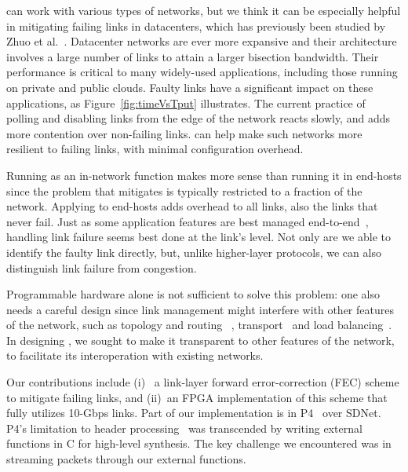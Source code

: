 \OurSys can work with various types of networks, but we think it can be
especially helpful in mitigating failing links in datacenters, which has
previously been studied by Zhuo et al.~\cite{Zhuo:2017:UMP:3098822.3098849}.
Datacenter networks are ever more expansive and their architecture involves a
large number of links to attain a larger bisection bandwidth. Their
performance is critical to many widely-used applications, including those
running on private and public clouds. Faulty  links have a significant impact
on these applications, as Figure~\ref{fig:timeVsTput}  illustrates. The
current practice of polling and disabling links from the edge of the network
reacts slowly, and adds more contention over non-failing links. \OurSys can help
make such networks more resilient to failing links, with minimal configuration
overhead.

Running \OurSys as an in-network function makes more sense than
running it in end-hosts since the problem that \OurSys mitigates is
typically restricted to a fraction of the network.  Applying \OurSys to
end-hosts adds overhead to all links, also the links that never fail.
Just as some application features are
best managed end-to-end~\cite{Saltzer84end-to-endarguments}, handling
link failure seems best done at the link's level. Not only are we able to
identify the faulty link directly, but, unlike higher-layer protocols,
we can also distinguish link failure from congestion.

Programmable hardware alone is not sufficient to solve this problem: one
also needs a careful design since link management might interfere with
other features of the network, such as topology and routing~
\cite{Greenberg:2011:VSF:1897852.1897877,
NiranjanMysore:2009:PSF:1594977.1592575,
Agarwal:2014:SMS:2620728.2620758},
transport~\cite{Raiciu:2011:IDP:2043164.2018467,Alizadeh:2010:DCT:1851275.1851192}
and load balancing~\cite{Alizadeh:2014:CDC:2740070.2626316}.
In designing \OurSys, we sought to make it transparent to other
features of the network, to facilitate its interoperation with
existing networks.

Our contributions include (i)~
a link-layer forward error-correction (FEC) scheme to mitigate failing
links, and (ii)~an FPGA implementation of this scheme that fully utilizes 10-Gbps
links. Part of our implementation is in
P4~\cite{Bosshart:2014:PPP:2656877.2656890} over SDNet.
P4's limitation to header processing~\cite{Dang:2017:WPL:3050220.3050231}
was transcended by writing external functions in C for high-level synthesis.
The key challenge we encountered was in streaming packets through our
external functions.%

